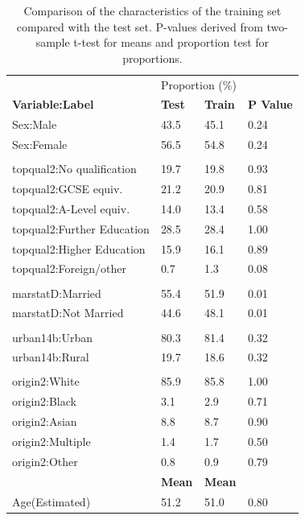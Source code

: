 \documentclass[
  11pt,
  twocolumn]{article}
\begin{document}
\begin{table}

\caption{\label{tab:outputtesttraintable}Comparison of the characteristics of the training set compared with the test set. P-values derived from two-sample t-test for means and proportion test for proportions. \label{tab:output-testtrain-table}}
\centering
\fontsize{7}{9}\selectfont
\begin{tabular}[t]{l|l|l|l}
\hline
\multicolumn{1}{c|}{ } & \multicolumn{2}{c}{Proportion (\%)} \\
\cline{2-3}
\textbf{Variable:Label} & \textbf{Test} & \textbf{Train} & \textbf{P Value}\\
\hline
Sex:Male & 43.5 & 45.1 & 0.24\\
\hline
Sex:Female & 56.5 & 54.8 & 0.24\\
\hline
 &  &  \vphantom{3} & \\
\hline
topqual2:No qualification & 19.7 & 19.8 & 0.93\\
\hline
topqual2:GCSE equiv. & 21.2 & 20.9 & 0.81\\
\hline
topqual2:A-Level equiv. & 14.0 & 13.4 & 0.58\\
\hline
topqual2:Further Education & 28.5 & 28.4 & 1.00\\
\hline
topqual2:Higher Education & 15.9 & 16.1 & 0.89\\
\hline
topqual2:Foreign/other & 0.7 & 1.3 & 0.08\\
\hline
 &  &  \vphantom{2} & \\
\hline
marstatD:Married & 55.4 & 51.9 & 0.01\\
\hline
marstatD:Not Married & 44.6 & 48.1 & 0.01\\
\hline
 &  &  \vphantom{1} & \\
\hline
urban14b:Urban & 80.3 & 81.4 & 0.32\\
\hline
urban14b:Rural & 19.7 & 18.6 & 0.32\\
\hline
 &  &  & \\
\hline
origin2:White & 85.9 & 85.8 & 1.00\\
\hline
origin2:Black & 3.1 & 2.9 & 0.71\\
\hline
origin2:Asian & 8.8 & 8.7 & 0.90\\
\hline
origin2:Multiple & 1.4 & 1.7 & 0.50\\
\hline
origin2:Other & 0.8 & 0.9 & 0.79\\
\hline
\textbf{} & \textbf{Mean} & \textbf{Mean} & \textbf{}\\
\hline
Age(Estimated) & 51.2 & 51.0 & 0.80\\
\hline
\end{tabular}
\end{table}
\end{document}

